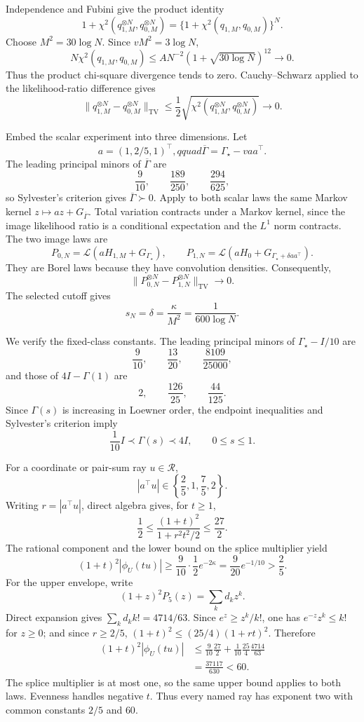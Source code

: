 Independence and Fubini give the product identity
\[
 1+\chi^2(q_{1,M}^{\otimes N},q_{0,M}^{\otimes N})
 =\{1+\chi^2(q_{1,M},q_{0,M})\}^{N}.
\]
Choose \(M^2=30\log N\).  Since \(vM^2=3\log N\),
\[
 N\chi^2(q_{1,M},q_{0,M})
 \le A N^{-2}(1+\sqrt{30\log N})^{12}\longrightarrow0.
\]
Thus the product chi-square divergence tends to zero.  Cauchy--Schwarz applied to the likelihood-ratio difference gives
\[
 \|q_{1,M}^{\otimes N}-q_{0,M}^{\otimes N}\|_{\mathrm{TV}}
 \le\frac12
 \sqrt{\chi^2(q_{1,M}^{\otimes N},q_{0,M}^{\otimes N})}
 \longrightarrow0.
\]

Embed the scalar experiment into three dimensions.  Let
\[
 a=(1,2/5,1)^\top,qquad
 \overline\Gamma=\Gamma_\star-vaa^\top.
\]
The leading principal minors of \(\overline\Gamma\) are
\[
 \frac9{10},\qquad \frac{189}{250},\qquad \frac{294}{625},
\]
so Sylvester's criterion gives \(\overline\Gamma\succ0\).  Apply to both scalar laws the same Markov kernel \(z\mapsto az+G_{\overline\Gamma}\).  Total variation contracts under a Markov kernel, since the image likelihood ratio is a conditional expectation and the \(L^1\) norm contracts.  The two image laws are
\[
 P_{0,N}=\mathcal L(aH_{1,M}+G_{\Gamma_\star}),
 \qquad
 P_{1,N}=\mathcal L(aH_0+G_{\Gamma_\star+\delta aa^\top}).
\]
They are Borel laws because they have convolution densities.  Consequently,
\[
 \|P_{0,N}^{\otimes N}-P_{1,N}^{\otimes N}\|_{\mathrm{TV}}
 \longrightarrow0.
\]
The selected cutoff gives
\[
 s_N=\delta=\frac{\kappa}{M^2}
 =\frac1{600\log N}.
\]

We verify the fixed-class constants.  The leading principal minors of
\(\Gamma_\star-I/10\) are
\[
 \frac9{10},\qquad \frac{13}{20},\qquad \frac{8109}{25000},
\]
and those of \(4I-\Gamma(1)\) are
\[
 2,\qquad \frac{126}{25},\qquad \frac{44}{125}.
\]
Since \(\Gamma(s)\) is increasing in Loewner order, the endpoint inequalities and Sylvester's criterion imply
\[
 \frac1{10}I\prec\Gamma(s)\prec4I,
 \qquad 0\le s\le1.
\]

For a coordinate or pair-sum ray \(u\in\mathcal R\),
\[
 |a^\top u|\in\left\{\frac25,1,\frac75,2\right\}.
\]
Writing \(r=|a^\top u|\), direct algebra gives, for \(t\ge1\),
\[
 \frac12\le\frac{(1+t)^2}{1+r^2t^2/2}
 \le\frac{27}{2}.
\]
The rational component and the lower bound on the splice multiplier yield
\[
 (1+t)^2|\phi_U(tu)|
 \ge\frac9{10}\cdot\frac12 e^{-2\kappa}
 =\frac9{20}e^{-1/10}>\frac25.
\]
For the upper envelope, write
\[
 (1+z)^2P_5(z)=\sum_k d_kz^k.
\]
Direct expansion gives \(\sum_k d_k k!=4714/63\).  Since
\(e^z\ge z^k/k!\), one has \(e^{-z}z^k\le k!\) for \(z\ge0\); and since \(r\ge2/5\),
\((1+t)^2\le(25/4)(1+rt)^2\).  Therefore
\[
 \begin{aligned}
 (1+t)^2|\phi_U(tu)|
 &\le\frac9{10}\frac{27}{2}
   +\frac1{10}\frac{25}{4}\frac{4714}{63}\\
 &=\frac{37117}{630}<60.
 \end{aligned}
\]
The splice multiplier is at most one, so the same upper bound applies to both laws.  Evenness handles negative \(t\).  Thus every named ray has exponent two with common constants \(2/5\) and \(60\).

